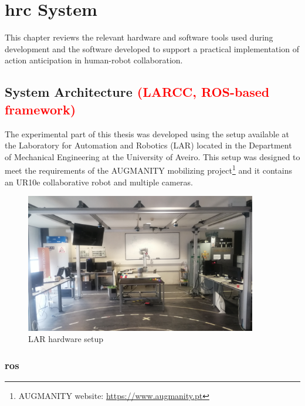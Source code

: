 \chapter{\acl{hrc} System}
\label{chapter:hrc_system}

This chapter reviews the relevant hardware and software tools used during development and the software developed to support a practical implementation of action anticipation in human-robot collaboration.

\section{System Architecture \textcolor{red}{(LARCC, ROS-based framework)}}

The experimental part of this thesis was developed using the setup available at the Laboratory for Automation and Robotics (LAR) located in the Department of Mechanical Engineering at the University of Aveiro. This setup was designed to meet the requirements of the AUGMANITY mobilizing project\footnote{AUGMANITY website: \url{https://www.augmanity.pt}} and it contains an UR10e collaborative robot and multiple cameras.

\begin{figure}[h]
\centerline{\includegraphics[width=0.9\textwidth, trim={0 5cm 0 0}, clip]{figs/setup2.jpg}}
\caption[setup]{LAR hardware setup}
\label{fig:ur10e}
\end{figure}

\subsection{\acf{ros}}

